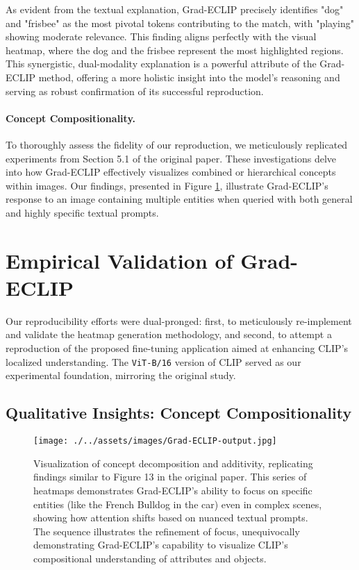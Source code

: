 \documentclass[10pt]{article} %
\begin{document}
As evident from the textual explanation, Grad-ECLIP precisely identifies "dog" and "frisbee" as the most pivotal tokens contributing to the match, with "playing" showing moderate relevance. This finding aligns perfectly with the visual heatmap, where the dog and the frisbee represent the most highlighted regions. This synergistic, dual-modality explanation is a powerful attribute of the Grad-ECLIP method, offering a more holistic insight into the model's reasoning and serving as robust confirmation of its successful reproduction.

\paragraph{Concept Compositionality.}
To thoroughly assess the fidelity of our reproduction, we meticulously replicated experiments from Section 5.1 of the original paper. These investigations delve into how Grad-ECLIP effectively visualizes combined or hierarchical concepts within images. Our findings, presented in Figure \ref{fig:decomposition_repro}, illustrate Grad-ECLIP's response to an image containing multiple entities when queried with both general and highly specific textual prompts.

\section{Empirical Validation of Grad-ECLIP}
\label{repro_efforts} %

Our reproducibility efforts were dual-pronged: first, to meticulously re-implement and validate the heatmap generation methodology, and second, to attempt a reproduction of the proposed fine-tuning application aimed at enhancing CLIP's localized understanding. The \texttt{ViT-B/16} version of CLIP served as our experimental foundation, mirroring the original study.

\subsection{Qualitative Insights: Concept Compositionality}

\begin{figure}[h!]
\centering
\texttt{[image: ./../assets/images/Grad-ECLIP-output.jpg]} 
\caption{Visualization of concept decomposition and additivity, replicating findings similar to Figure 13 in the original paper. This series of heatmaps demonstrates Grad-ECLIP's ability to focus on specific entities (like the French Bulldog in the car) even in complex scenes, showing how attention shifts based on nuanced textual prompts. The sequence illustrates the refinement of focus, unequivocally demonstrating Grad-ECLIP's capability to visualize CLIP's compositional understanding of attributes and objects.}
\label{fig:decomposition_repro}
\end{figure}
\end{document}
